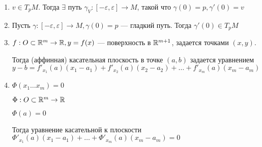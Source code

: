 \begin{remark}\itemfix
    \begin{enumerate}
        \item $v\in T_pM$. Тогда $\exists$ путь $\gamma_V : [-\varepsilon, \varepsilon] \to M$, такой что $\gamma(0)=p, \gamma'(0)=v$
        \item Пусть $\gamma : [-\varepsilon, \varepsilon]\to M, \gamma(0) = p$ --- гладкий путь. Тогда $\gamma'(0) \in T_pM$
        \item $f : O\subset\mathbb{R}^m \to\mathbb{R}, y=f(x)$ --- поверхность в $\mathbb{R}^{m+1}$, задается точками $(x, y)$.

              Тогда (аффинная) касательная плоскость в точке $(a, b)$ задается уравнением
              $$y-b = f'_{x_1}(a)(x_1-a_1) + f'_{x_2}(a)(x_2-a_2) + \ldots + f'_{x_m}(a)(x_m-a_m)$$
        \item $\Phi(x_1\ldots x_m) = 0$

              $\Phi : O\subset\mathbb{R}^m \to\mathbb{R}$

              $\Phi(a) = 0$

              Тогда уравнение касательной к плоскости $\Phi'_{x_1}(a)(x_1-a_1) + \ldots + \Phi'_{x_m}(a)(x_m-a_m) = 0$
    \end{enumerate}
\end{remark}
